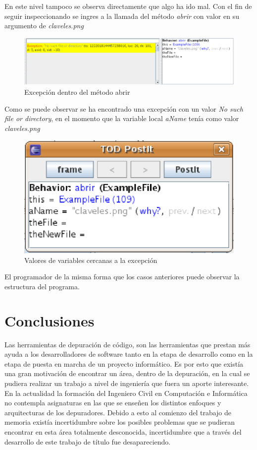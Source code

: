 \documentclass[12pt,legalpaper]{report}
\begin{document}
En este nivel tampoco se observa directamente que algo ha ido mal.  Con el fin de seguir inspeccionando se ingres a la llamada del método \textit{abrir} con valor en su argumento de \textit{claveles.png}

\begin{figure}[h]
	\centering
	\includegraphics[scale=0.5]{images/manejadorArchivo/Exception.eps}
	\caption{Excepción dentro del método abrir}
\end{figure}

Como se puede observar se ha encontrado una excepción con un valor \textit{No such file or directory}, en el momento que la variable local \textit{aName} tenía como valor \textit{claveles.png}

\begin{figure}[h]
	\centering
	\includegraphics[scale=0.6]{images/manejadorArchivo/state.eps}
	\caption{Valores de variables cercanas a la excepción}
\end{figure}

El programador de la misma forma que los casos anteriores puede observar la estructura del programa.

\chapter{Conclusiones}

Las herramientas de depuración de código, son las herramientas que prestan más ayuda a los desarrolladores de software tanto en la etapa de desarrollo como en la etapa de puesta en marcha de un proyecto informático.  Es por esto que existía una gran motivación de encontrar un área, dentro de la depuración, en la cual se pudiera realizar un trabajo a nivel de ingeniería que fuera un aporte interesante.  En la actualidad la formación del Ingeniero Civil en Computación e Informática no contempla asignaturas en las que se enseñen los distintos enfoques y arquitecturas de los depuradores.  Debido a esto al comienzo del trabajo de memoria existía incertidumbre sobre los posibles problemas que se pudieran encontrar en esta área totalmente desconocida, incertidumbre que a través del desarrollo de este trabajo de título fue desapareciendo.
\end{document}
